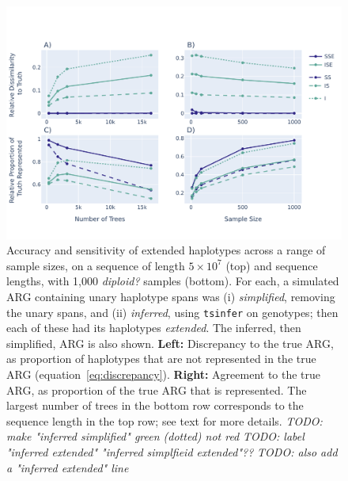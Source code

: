 \documentclass[10pt,twoside,lineno]{gsajnl}
\newcommand{\tsinfer}{\texttt{tsinfer}}
\newcommand{\comment}[1]{{\color{violet} \it #1}}
\begin{document}
\begin{figure}
	\begin{center}
        \includegraphics[width=\textwidth]{newplots_wo_ee/dissimilarity.pdf}
	\end{center}
    \caption{
        Accuracy and sensitivity of extended haplotypes
        across a range of sample sizes, on a sequence of length $5\times10^7$ (top)
        and sequence lengths, with 1,000 \comment{diploid?} samples (bottom).
        For each, a simulated ARG containing unary haplotype spans
        was (i) \emph{simplified}, removing the unary spans,
        and (ii) \emph{inferred}, using \tsinfer{} on genotypes;
        then each of these had its haplotypes \emph{extended}.
        The inferred, then simplified, ARG is also shown.
        \textbf{Left:} Discrepancy to the true ARG,
        as proportion of haplotypes that are not represented in the true ARG
        (equation~\eqref{eq:discrepancy}).
        \textbf{Right:} Agreement to the true ARG,
        as proportion of the true ARG that is represented.
        The largest number of trees in the bottom row corresponds
        to the sequence length in the top row;
        see text for more details.
        \comment{TODO: make "inferred simplified" green (dotted) not red}
        \comment{TODO: label "inferred extended" "inferred simplfieid extended"??}
        \comment{TODO: also add a "inferred extended" line}
    }
    \label{fig:discrepancy}
\end{figure}
\end{document}
